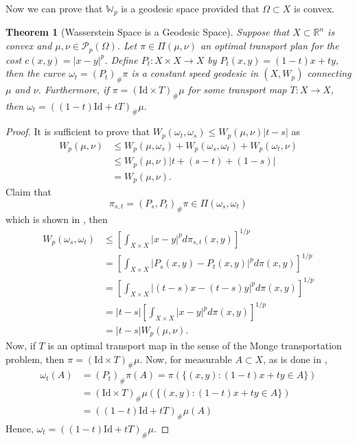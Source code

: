 \documentclass[12pt]{article}
\newcommand{\R}{\mathbb{R}}
\theoremstyle{plain}
\newtheorem{thm}{Theorem}[section]
\numberwithin{equation}{section}
\begin{document}
Now we can prove that $\mathbb{W}_p$ is a geodesic space provided that $\Omega \subset X$ is convex.
\begin{thm}[Wasserstein Space is a Geodesic Space]\label{thm:geodesic}
  Suppose that $X\subset \R^n$ is convex and $\mu,\nu \in \mathcal{P}_p(\Omega)$. Let $\pi\in \Pi(\mu,\nu)$ an 
  optimal transport plan for the cost $c(x,y) = |x-y|^p$. Define $P_t : X\times X \to X$ by $P_t(x,y) = (1-t)x + ty$, then the 
  curve $\omega_t = (P_t)_\#\pi$ is a constant speed geodesic in $(X, W_p)$ connecting $\mu$ and $\nu$. Furthermore, if $\pi = (\text{Id}\times T)_\#\mu$ for some transport map $T:X\to X$, then 
  $\omega_t = ((1-t)\text{Id} + tT)_\# \mu$. 
\end{thm}
\begin{proof}
  It is sufficient to prove that $W_p(\omega_t,\omega_s) \le W_p(\mu,\nu)|t-s|$ as 
  \begin{align*}
    W_p(\mu,\nu) &\le W_p(\mu,\omega_s) + W_p(\omega_s,\omega_t) + W_p(\omega_t,\nu) \\
    &\le W_p(\mu,\nu)|t+(s-t)+(1-s)|\\
    & = W_p(\mu,\nu).
  \end{align*}
  Claim that \begin{equation}\label{eqn:lemgeo}\pi_{s,t} = (P_s,P_t)_\#\pi\in \Pi(\omega_s,\omega_t)\end{equation}
  which is shown in \cite{thorpe}, then 
  \begin{align*}
    W_p(\omega_s,\omega_t) &\le \left[\int_{X\times X}|x-y|^pd\pi_{s,t}(x,y)\right]^{1/p}\\
    & = \left[\int_{X\times X}|P_s(x,y)-P_t(x,y)|^pd\pi(x,y)\right]^{1/p} \\
    &= \left[\int_{X\times X}|(t-s)x-(t-s)y|^pd\pi(x,y)\right]^{1/p} \\
    &= |t-s|\left[\int_{X\times X}|x-y|^pd\pi(x,y)\right]^{1/p} \\
    &= |t-s|W_p(\mu,\nu).
  \end{align*}
  Now, if $T$ is an optimal transport map in the sense of the Monge transportation problem, then $\pi = (\text{Id}\times T)_\#\mu$. Now, for measurable $A\subset X$, as is done in \cite{thorpe},
  \begin{align*}
    \omega_t(A) &= (P_t)_\#\pi(A) = \pi(\{(x,y) : (1-t)x + ty\in A\}) \\
    &= (\text{Id}\times T)_\#\mu(\{(x,y):(1-t)x + ty\in A\}) \\
    &= ((1-t)\text{Id} + tT)_\#\mu(A)
  \end{align*}
  Hence, $\omega_t = ((1-t)\text{Id} + tT)_\#\mu.$
\end{proof}
\end{document}
